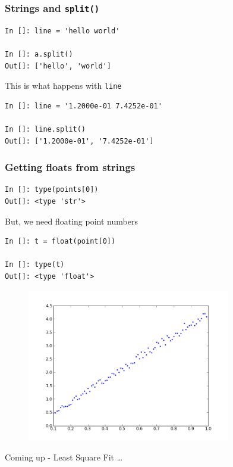 \documentclass[14pt,compress]{beamer}
\newcommand{\typ}[1]{\lstinline{#1}}
\begin{document}
\begin{frame}[fragile]
\frametitle{Strings and \typ{split()}}
  \begin{lstlisting}
In []: line = 'hello world'

In []: a.split()
Out[]: ['hello', 'world']
  \end{lstlisting}
This is what happens with \typ{line}
  \begin{lstlisting}
In []: line = '1.2000e-01 7.4252e-01'

In []: line.split()
Out[]: ['1.2000e-01', '7.4252e-01']
  \end{lstlisting}
\end{frame}

\begin{frame}[fragile]
\frametitle{Getting floats from strings}
  \begin{lstlisting}
In []: type(points[0])
Out[]: <type 'str'>
  \end{lstlisting}
But, we need floating point numbers
  \begin{lstlisting}
In []: t = float(point[0])

In []: type(t)
Out[]: <type 'float'>
  \end{lstlisting}
\end{frame}

\begin{frame}[fragile]
\begin{figure}
\includegraphics[width=3.5in]{data/L-Tsq.png}
\end{figure}
\vspace{-0.2in}
Coming up - \alert{Least Square Fit \ldots}
\end{frame}
\end{document}
